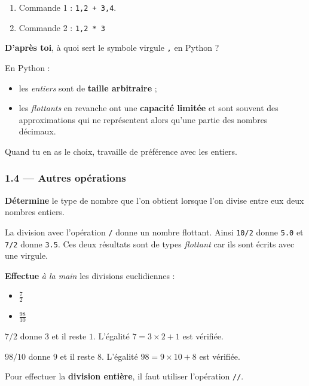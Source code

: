 \documentclass[a4paper,17pt]{extarticle}
\providecommand{\tightlist}{%
      \setlength{\itemsep}{0pt}\setlength{\parskip}{0pt}}
\begin{document}
\begin{enumerate}
\def\labelenumi{\arabic{enumi}.}
\tightlist
\item
  Commande 1 : \texttt{1,2\ +\ 3,4}.
\item
  Commande 2 : \texttt{1,2\ *\ 3}
\end{enumerate}

\textbf{D'après toi}, à quoi sert le symbole virgule \texttt{,} en
Python ?

    En Python :

\begin{itemize}
\tightlist
\item
  les \emph{entiers} sont de \textbf{taille arbitraire} ;
\item
  les \emph{flottants} en revanche ont une \textbf{capacité limitée} et
  sont souvent des approximations qui ne représentent alors qu'une
  partie des nombres décimaux.
\end{itemize}

Quand tu en as le choix, travaille de préférence avec les entiers.

    \hypertarget{autres-opuxe9rations}{%
\subsubsection{1.4 --- Autres opérations}\label{autres-opuxe9rations}}

    \textbf{Détermine} le type de nombre que l'on obtient lorsque l'on
divise entre eux deux nombres entiers.

    La division avec l'opération \texttt{/} donne un nombre flottant. Ainsi
\texttt{10/2} donne \texttt{5.0} et \texttt{7/2} donne \texttt{3.5}. Ces
deux résultats sont de types \emph{flottant} car ils sont écrits avec
une virgule.

    \textbf{Effectue} \emph{à la main} les divisions euclidiennes :

\begin{itemize}
\tightlist
\item
  \(\frac 72\)
\item
  \(\frac {98}{10}\)
\end{itemize}

    \(7/2\) donne \(3\) et il reste \(1\). L'égalité \(7 = 3 \times 2 + 1\)
est vérifiée.

\(98 / 10\) donne \(9\) et il reste \(8\). L'égalité
\(98 = 9 \times 10 + 8\) est vérifiée.

    Pour effectuer la \textbf{division entière}, il faut utiliser
l'opération \texttt{//}.
\end{document}
